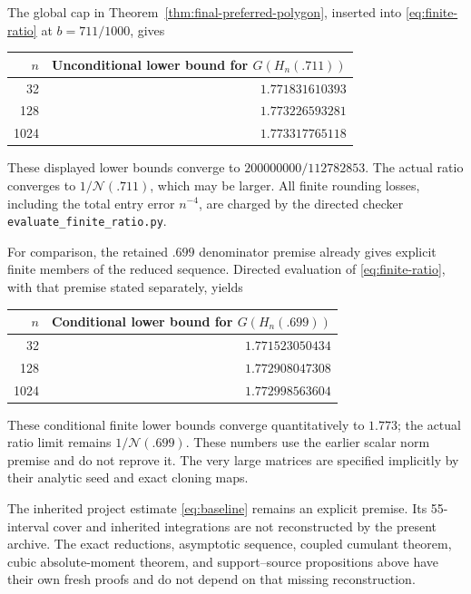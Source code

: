 \documentclass[11pt]{article}
\newcommand{\N}{\mathcal N}
\begin{document}
The global cap in Theorem~\ref{thm:final-preferred-polygon}, inserted
into \eqref{eq:finite-ratio} at $b=711/1000$, gives
\begin{center}\small
\begin{tabular}{rr}
$n$ & Unconditional lower bound for $G(H_n(.711))$\\\hline
32 & $1.771831610393$\\
128 & $1.773226593281$\\
1024 & $1.773317765118$\\\hline
\end{tabular}
\end{center}
These displayed lower bounds converge to $200000000/112782853$.
The actual ratio converges to $1/\N(.711)$, which may be larger.
All finite rounding losses, including the total entry error $n^{-4}$,
are charged by the directed checker
\texttt{evaluate\_\allowbreak finite\_\allowbreak ratio.py}.

For comparison, the retained $.699$ denominator premise already gives
explicit finite members of the reduced sequence. Directed evaluation of
\eqref{eq:finite-ratio}, with that premise stated separately, yields
\begin{center}\small
\begin{tabular}{rr}
$n$ & Conditional lower bound for $G(H_n(.699))$\\\hline
32 & $1.771523050434$\\
128 & $1.772908047308$\\
1024 & $1.772998563604$\\\hline
\end{tabular}
\end{center}
These conditional finite lower bounds converge quantitatively to
$1.773$; the actual ratio limit remains $1/\N(.699)$. These numbers
use the earlier scalar norm premise and do not reprove it. The very large matrices are specified implicitly
by their analytic seed and exact cloning maps.

The inherited project estimate \eqref{eq:baseline} remains an
explicit premise. Its 55-interval cover and inherited integrations are
not reconstructed by the present archive. The exact reductions,
asymptotic sequence, coupled cumulant theorem, cubic absolute-moment
theorem, and support--source propositions above have their own fresh
proofs and do not depend on that missing reconstruction.
\end{document}
